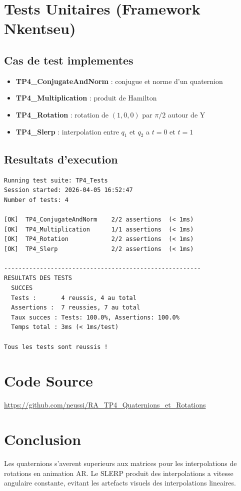 \documentclass[12pt,a4paper]{article}
\begin{document}
\section{Tests Unitaires (Framework Nkentseu)}

\subsection{Cas de test implementes}

\begin{itemize}
    \item \textbf{TP4\_ConjugateAndNorm} : conjugue et norme d'un quaternion
    \item \textbf{TP4\_Multiplication} : produit de Hamilton
    \item \textbf{TP4\_Rotation} : rotation de $(1,0,0)$ par $\pi/2$ autour de Y
    \item \textbf{TP4\_Slerp} : interpolation entre $q_1$ et $q_2$ a $t=0$ et $t=1$
\end{itemize}

\subsection{Resultats d'execution}

\begin{lstlisting}[caption=Sortie de jenga test -- TP4]
Running test suite: TP4_Tests
Session started: 2026-04-05 16:52:47
Number of tests: 4

[OK]  TP4_ConjugateAndNorm    2/2 assertions  (< 1ms)
[OK]  TP4_Multiplication      1/1 assertions  (< 1ms)
[OK]  TP4_Rotation            2/2 assertions  (< 1ms)
[OK]  TP4_Slerp               2/2 assertions  (< 1ms)

-------------------------------------------------------
RESULTATS DES TESTS
  SUCCES
  Tests :       4 reussis, 4 au total
  Assertions :  7 reussies, 7 au total
  Taux succes : Tests: 100.0%, Assertions: 100.0%
  Temps total : 3ms (< 1ms/test)

Tous les tests sont reussis !
\end{lstlisting}

\section{Code Source}

\begin{center}
\href{https://github.com/neussi/RA_TP4_Quaternions_et_Rotations}{https://github.com/neussi/RA\_TP4\_Quaternions\_et\_Rotations}
\end{center}

\section{Conclusion}

Les quaternions s'averent superieurs aux matrices pour les interpolations de rotations
en animation AR. Le SLERP produit des interpolations a vitesse angulaire constante,
evitant les artefacts visuels des interpolations lineaires.
\end{document}
